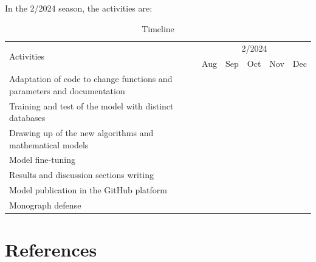\documentclass[12pt, a4paper, twoside]{article}
\numberwithin{equation}{subsection} %
\begin{document}
In the 2/2024 season, the activities are:

         \begin{table}[H]
         \centering
         \footnotesize
         \caption{Timeline}
             \begin{tabular}{|l|c|c|c|c|c|} \hline
                 \multirow{2}{*}{Activities} & \multicolumn{5}{c|}{2/2024} \\ \cline{2-6}
                   & Aug & Sep & Oct & Nov & Dec \\ \hline
               Adaptation of code to change functions and parameters and documentation    & \cellcolor{midgray} & \cellcolor{midgray} &\cellcolor{midgray} &\cellcolor{midgray} & \\ \hline
                  Training and test of the model with distinct databases   &  &  &\cellcolor{midgray} &\cellcolor{midgray} & \\ \hline
                   Drawing up of the new algorithms and mathematical models  &  &   &  &   & \\ \hline
                  Model fine-tuning &  &   & \cellcolor{midgray} & \cellcolor{midgray} &\\ \hline
                 Results and discussion sections writing    & & & \cellcolor{midgray} & \cellcolor{midgray} & \cellcolor{midgray} \\ \hline
                  Model publication in the GitHub platform & \cellcolor{midgray} & \cellcolor{midgray} & \cellcolor{midgray} & \cellcolor{midgray} & \cellcolor{midgray}\\ \hline
                 Monograph defense  & & & & & \cellcolor{midgray} \\ \hline
             \end{tabular}
         \end{table}

\newpage

\section*{References}\label{references}
\end{document}
